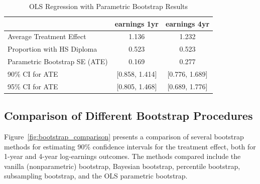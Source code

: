 \documentclass[11pt]{article}
\numberwithin{equation}{section}
\begin{document}
\begin{table}[h]
    \centering
    \begin{tabular}{lcc}
        \hline
         & earnings 1yr & earnings 4yr \\
        \hline
        Average Treatment Effect & 1.136 & 1.232 \\
        Proportion with HS Diploma & 0.523 & 0.523 \\
        Parametric Bootstrap SE (ATE) & 0.169 & 0.277 \\
        90\% CI for ATE & [0.858, 1.414] & [0.776, 1.689] \\
        95\% CI for ATE & [0.805, 1.468] & [0.689, 1.776] \\
        \hline
    \end{tabular}
    \caption{\label{tab:ols_regression_results}OLS Regression with Parametric Bootstrap Results}
\end{table}


\subsection{Comparison of Different Bootstrap Procedures}


Figure~\ref{fig:bootstrap_comparison} presents a comparison of several bootstrap methods for estimating 90\% confidence intervals for the treatment effect, both for 1-year and 4-year log-earnings outcomes. The methods compared include the vanilla (nonparametric) bootstrap, Bayesian bootstrap, percentile bootstrap, subsampling bootstrap, and the OLS parametric bootstrap.
\end{document}
